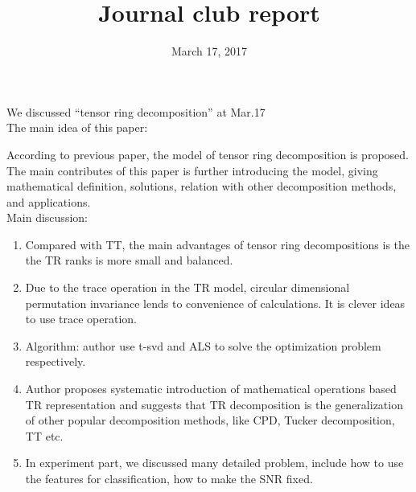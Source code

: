 \documentclass[UTF8]{article}
\begin{document}
	\title{Journal club report}	
	\date{March 17, 2017} 
	\maketitle
    	We discussed “tensor ring decomposition” at Mar.17\\
    	The main idea of this paper:
    	
    	According to previous paper, the model of tensor ring decomposition is proposed. The main contributes of this paper is further introducing the model, giving mathematical definition, solutions, relation with other decomposition methods, and applications.\\
    	Main discussion:
    	\begin{enumerate}[1)]
    		\item Compared with TT, the main advantages of tensor ring decompositions is the the TR ranks is more small and balanced.
    		\item Due to the trace operation in the TR model, circular dimensional permutation invariance lends to convenience of calculations. It is clever ideas to use trace operation.
    		\item	Algorithm: author use t-svd and ALS to solve the optimization problem respectively.
    		\item	 Author proposes systematic introduction of mathematical operations based TR representation and suggests that TR decomposition is the generalization of other popular decomposition methods, like CPD, Tucker decomposition, TT etc.
    		\item	In experiment part, we discussed many detailed problem, include how to use the features for classification, how to make the SNR fixed.
    	\end{enumerate}
    
   	
    		
\end{document}
